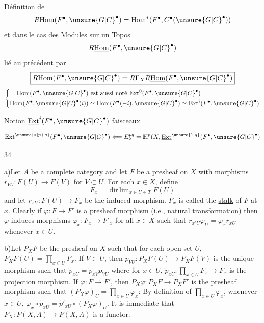 Définition de
\[
R\mathrm{Hom}(F^\bullet,\unsure{G|C}^\bullet)
=\mathrm{Hom}^*(F^\bullet,C^\bullet(\unsure{G|C}^\bullet))
\]
et dans le cas des Modules sur un Topos
\[
R\underline{\mathrm{Hom}}(F^\bullet,\unsure{G|C}^\bullet)
\]
lié au précédent par
\[
\boxed{R\mathrm{Hom}(F^\bullet,\unsure{G|C}^\bullet)=
R\Gamma_X R\underline{\mathrm{Hom}}(F^\bullet,\unsure{G|C}^\bullet)}
\]
\[
\left\{\begin{aligned}
\mathrm{Hom}(F^\bullet,\unsure{G|C}^\bullet)&\text{ est aussi noté }
\mathrm{Ext}^0(F^\bullet,\unsure{G|C}^\bullet)\\
\mathrm{Hom}(F^\bullet,\unsure{G|C}^\bullet(i))&\simeq
\mathrm{Hom}(F^\bullet(-i),\unsure{G|C}^\bullet)
\simeq\mathrm{Ext}^i(F^\bullet,\unsure{G|C}^\bullet)
\end{aligned}\right.
\]

Notion $\underline{\mathrm{Ext}}^i(F^\bullet,\unsure{G|C}^\bullet)$
\uline{faisceaux}

\[
\mathrm{Ext}^{\unsure{*|p+q}}(F^\bullet,\unsure{G|C}^\bullet)
\Longleftarrow E^{pq}_2=
\mathbb H^p(X,\underline{\mathrm{Ext}}^{\unsure{1|q}}(F^\bullet,\unsure{G|C}^\bullet)
\]

\hfill 34

a)\quad Let $\underline A$ be a complete category and let $F$ be a presheaf
on $X$ with morphisms $r_{VU}:F(U)\longrightarrow F(V)$ for $V\subset U$.
For each $x\in X$, define
\[
F_x=\mathop{\mathrm{dir\,lim}}_{x\in U\in\underline T}F(U)
\]
and let $r_{xU}:F(U)\longrightarrow F_x$ be the induced morphism.
$F_x$ is called the \uline{stalk} of $F$ at $x$.
Clearly if $\varphi:F\longrightarrow F'$ is a presheaf morphism
(i.e., natural transformation) then $\varphi$ induces morphisms
$\varphi_x:F_x\longrightarrow F'_x$ for all $x\in X$ such that
$r_{x'U}\varphi_U=\varphi_xr_{xU}$ whenever $x\in U$.

b)\quad Let $P_XF$ be the presheaf on $X$ such that for each open set $U$,
$P_XF(U)=\prod_{x\in U}F_x$.
If $V\subset U$, then $p_{VU}:P_XF(U)\longrightarrow P_XF(V)$ is the unique
morphism such that $\tilde p_{xU}=\tilde p_{xV}p_{VU}$ where for $x\in U$,
$\tilde p_{xU}:\prod_{x\in U}F_x\longrightarrow F_x$ is the projection morphism.
If $\varphi:F\longrightarrow F'$, then
$P_X\varphi:P_XF\longrightarrow P_XF'$ is the presheaf morphism such that
$(P_X\varphi)_U=\prod_{x\in U}\varphi_x$:
By definition of $\prod_{x\in U}\varphi_x$, whenever $x\in U$,
$\varphi_x\circ\tilde p_{xU}=\tilde p'_{xU}\circ(P_X\varphi)_U$.
It is immediate that $P_X:\underline P(X,\underline A)\longrightarrow
\underline P(X,\underline A)$ is a functor.

